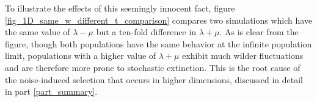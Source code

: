 To illustrate the effects of this seemingly innocent fact, figure \ref{fig_1D_same_w_different_t_comparison} compares two simulations which have the same value of $\lambda - \mu$ but a ten-fold difference in $\lambda+\mu$. As is clear from the figure, though both populations have the same behavior at the infinite population limit, populations with a higher value of $\lambda+\mu$ exhibit much wilder fluctuations and are therefore more prone to stochastic extinction. This is the root cause of the noise-induced selection that occurs in higher dimensions, discussed in detail in part \ref{part_summary}.

